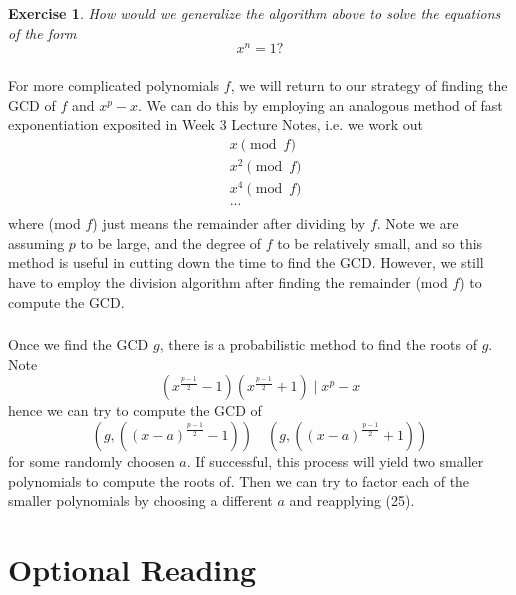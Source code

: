 \documentclass{article}
\newtheorem{exercise}{Exercise}
\begin{document}
\begin{exercise}
    How would we generalize the algorithm above to solve the equations of the form
    \begin{equation}
        x^{n} = 1?
    \end{equation}
\end{exercise}

\subsubsection{}
For more complicated polynomials $f$, we will return to our strategy of finding the GCD of $f$ and $x^{p} - x$. We can do this by employing an analogous method of fast exponentiation exposited in Week 3 Lecture Notes, i.e. we work out
\begin{equation}
    \begin{split}
        &x \pmod{f}\\
        &x^{2} \pmod{f}\\
        &x^{4} \pmod{f}\\
        &...\\
    \end{split}
\end{equation}
where (mod $f$) just means the remainder after dividing by $f$. Note we are assuming $p$ to be large, and the degree of $f$ to be relatively small, and so this method is useful in cutting down the time to find the GCD. However, we still have to employ the division algorithm after finding the remainder (mod $f$) to compute the GCD.

\subsubsection{}
Once we find the GCD $g$, there is a probabilistic method to find the roots of $g$. Note
\begin{equation}
    (x^{\frac{p-1}{2}}-1)(x^{\frac{p-1}{2}}+1) \mid x^{p} - x
\end{equation}
hence we can try to compute the GCD of
\begin{equation}
    (g, ((x-a)^{\frac{p-1}{2}}-1))
    \quad
    (g, ((x-a)^{\frac{p-1}{2}}+1))
\end{equation}
for some randomly choosen $a$. If successful, this process will yield two smaller polynomials to compute the roots of. Then we can try to factor each of the smaller polynomials by choosing a different $a$ and reapplying (25).

\section{Optional Reading}
\end{document}
